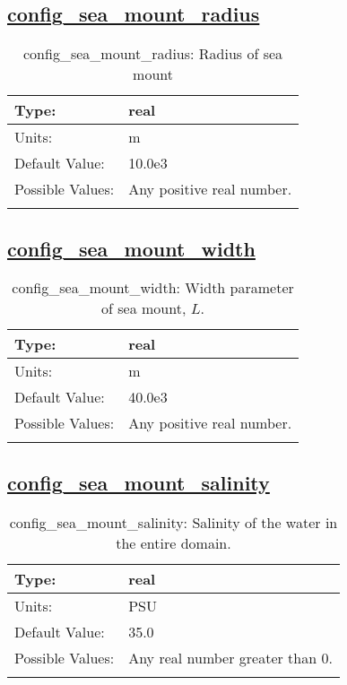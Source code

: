 \subsection[config\_sea\_mount\_radius]{\hyperref[sec:nm_tab_sea_mount]{config\_sea\_mount\_radius}}
\label{subsec:nm_sec_config_sea_mount_radius}
\begin{center}
\begin{longtable}{| p{2.0in} || p{4.0in} |}
    \hline
    Type: & real \\
    \hline
    Units: & \si{m} \\
    \hline
    Default Value: & 10.0e3 \\
    \hline
    Possible Values: & Any positive real number. \\
    \hline
    \caption{config\_sea\_mount\_radius: Radius of sea mount}
\end{longtable}
\end{center}
\subsection[config\_sea\_mount\_width]{\hyperref[sec:nm_tab_sea_mount]{config\_sea\_mount\_width}}
\label{subsec:nm_sec_config_sea_mount_width}
\begin{center}
\begin{longtable}{| p{2.0in} || p{4.0in} |}
    \hline
    Type: & real \\
    \hline
    Units: & \si{m} \\
    \hline
    Default Value: & 40.0e3 \\
    \hline
    Possible Values: & Any positive real number. \\
    \hline
    \caption{config\_sea\_mount\_width: Width parameter of sea mount, $L$.}
\end{longtable}
\end{center}
\subsection[config\_sea\_mount\_salinity]{\hyperref[sec:nm_tab_sea_mount]{config\_sea\_mount\_salinity}}
\label{subsec:nm_sec_config_sea_mount_salinity}
\begin{center}
\begin{longtable}{| p{2.0in} || p{4.0in} |}
    \hline
    Type: & real \\
    \hline
    Units: & \si{PSU} \\
    \hline
    Default Value: & 35.0 \\
    \hline
    Possible Values: & Any real number greater than 0. \\
    \hline
    \caption{config\_sea\_mount\_salinity: Salinity of the water in the entire domain.}
\end{longtable}
\end{center}
